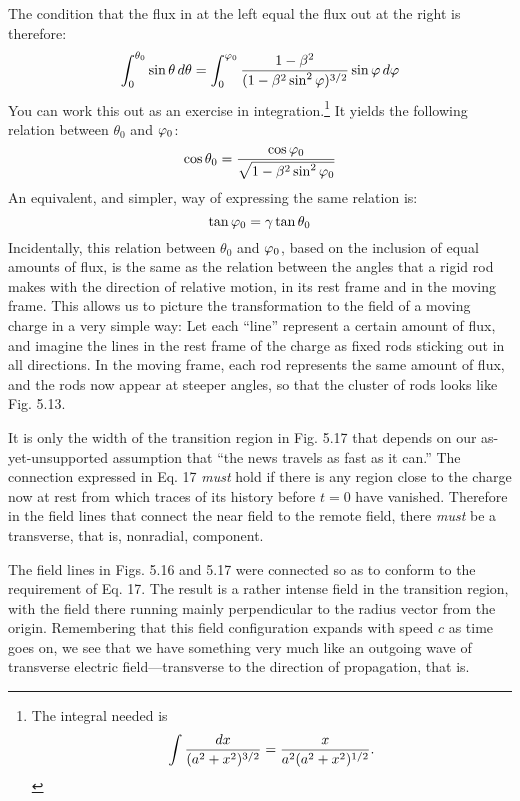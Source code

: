 The condition that the flux in at the left equal the flux out at the
right is therefore:
\begin{equation}
  \int_0^{\theta_0} \sin\theta\mathop{d\!}\theta
      = \int_0^{\varphi_0} \frac{1-\beta^2}{(1-\beta^2\sin^2\varphi)^{3/2}} \sin\varphi\mathop{d\!}\varphi
\end{equation}
You can work this out as an exercise in integration.\footnote{The integral needed is
\begin{equation*}
  \int \frac{\mathop{d\!} x}{(a^2+x^2)^{3/2}} = \frac{x}{a^2(a^2+x^2)^{1/2}} .
\end{equation*}
} It yields the following relation between $\theta_0$ and $\varphi_0$:
\begin{equation}
  \cos\theta_0 = \frac{\cos\varphi_0}{\sqrt{1-\beta^2\sin^2\varphi_0}}
\end{equation}
An equivalent, and simpler, way of expressing the same relation is:
\begin{equation}
  \tan\varphi_0 = \gamma\tan\theta_0
\end{equation}
Incidentally, this relation between $\theta_0$ and $\varphi_0$, based on the inclusion
of equal amounts of flux, is the same as the relation between the
angles that a rigid rod makes with the direction of relative motion,
in its rest frame and in the moving frame. This allows us to picture
the transformation to the field of a moving charge in a very simple
way: Let each ``line'' represent a certain amount of flux, and imagine
the lines in the rest frame of the charge as fixed rods sticking out in
all directions. In the moving frame, each rod represents the same
amount of flux, and the rods now appear at steeper angles, so that
the cluster of rods looks like Fig. 5.13.

It is only the width of the transition region in Fig. 5.17 that depends
on our as-yet-unsupported assumption that ``the news travels
as fast as it can.'' The connection expressed in Eq. 17 \emph{must} hold if
there is any region close to the charge now at rest from which traces
of its history before $t = 0$ have vanished. Therefore in the field lines
that connect the near field to the remote field, there \emph{must} be a transverse,
that is, nonradial, component.

The field lines in Figs. 5.16 and 5.17 were connected so as to conform
to the requirement of Eq. 17. The result is a rather intense
field in the transition region, with the field there running mainly perpendicular
to the radius vector from the origin. Remembering that
this field configuration expands with speed $c$ as time goes on, we see
that we have something very much like an outgoing wave of transverse
electric field---transverse to the direction of propagation, that is.

